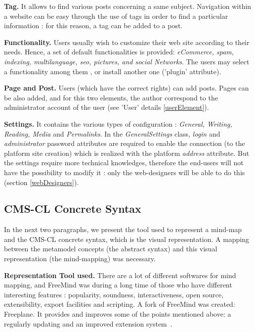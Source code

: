 \vspace{0.15em}
\noindent\textbf{Tag.} It allows to find various posts concerning a same subject. Navigation within a website can be easy through the use of tags in order to find a particular information : for this reason, a tag can be added to a post.

\vspace{0.15em}
\noindent\textbf{Functionality.} Users usually wish to customize their web site according to their needs. Hence, a set of default functionalities is provided: \textit{eCommerce, spam, indexing, multilanguage, seo, pictures, and social Networks}. The users may select a functionality among them , or install another one ('plugin' attribute).

\vspace{0.15em}
\noindent\textbf{Page and Post.} Users (which have the correct rights) can add posts. Pages can be also added, and for this two elements, the author correspond to the administrator account of the user (see 'User' details \ref{userElement}). 

\vspace{0.15em}
\noindent\textbf{Settings.} 
It contains the various types of configuration : \textit{General, Writing, Reading, Media} and \textit{Permalinks}. In the \textit{GeneralSettings} class, \textit{login} and \textit{administrator} password attributes are required to enable the connection (to the platform site creation) which is realized with the platform \textit{address} attribute. But the settings require more technical knowledges, therefore the end-users will not have the possibility to modify it : only the web-designers will be able to do this (section \ref{webDesigners}).
				
			\subsection{CMS-CL Concrete Syntax}\label{concreteSyntax}	
			   	In the next two paragraphs, we present the tool used to represent a mind-map and the CMS-CL concrete 
			   	syntax, which is the visual representation. A mapping between the metamodel concepts (the abstract 
			   	syntax) and this visual representation (the mind-mapping) was necessary.
			   	
			   \vspace{0.15em}
			   \noindent\textbf{Representation Tool used.}\label{representationTools}
			   			There are a lot of different softwares for mind	mapping, and FreeMind was during a long time of those who
			   			have different interesting features : popularity, soundness, interactiveness, open 
			   			source, extensibility, export facilities and scripting. A fork of FreeMind was created: Freeplane. It 								provides and improves some of the 
			   			points mentioned above: a regularly updating and an improved extension system~\cite{freeplane}.
																	
